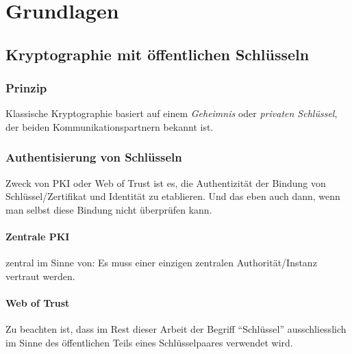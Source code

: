 
\chapter{Grundlagen}
\label{ch:Grundlagen}

\section{Kryptographie mit öffentlichen Schlüsseln}
\label{ch:Grundlagen:sec:PublicKeyCrypto}

\subsection{Prinzip}
\label{ch:Grundlagen:sec:PublicKeyCrypto:subsec:Prinzip}

Klassische Kryptographie basiert auf einem \emph{Geheimnis} oder
\emph{privaten Schl\"ussel}, der beiden Kommunikationspartnern bekannt
ist. 

\subsection{Authentisierung von Schlüsseln}
\label{ch:Grundlagen:sec:PublicKeyCrypto:subsec:KeyAuth}

Zweck von PKI oder Web of Trust ist es, die Authentizit\"at der
Bindung von Schl\"ussel/Zertifikat und Identit\"at zu etablieren. Und
das eben auch dann, wenn man selbst diese Bindung nicht \"uberpr\"ufen
kann.

\subsubsection{Zentrale PKI}
\label{ch:Grundlagen:sec:PublicKeyCrypto:subsec:KeyAuth:subsubsec:PKI}

zentral im Sinne von: Es muss einer einzigen zentralen
Authorit\"at/Instanz vertraut werden.

\subsubsection{Web of Trust}
\label{ch:Grundlagen:sec:PublicKeyCrypto:subsec:KeyAuth:subsubsec:WOT}

Zu beachten ist, dass im Rest dieser Arbeit der Begriff
``Schl\"ussel'' ausschliesslich im Sinne des \"offentlichen Teils
eines Schl\"usselpaares verwendet wird.

